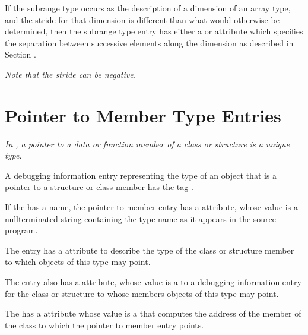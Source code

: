 If the subrange type occurs as the description of a dimension
of an array type, and the stride for that dimension is
\hypertarget{chap:DWATbytestridesubrangestridedimensionofarraytype}{}
different than what would otherwise be determined, then
\hypertarget{chap:DWATbitstridesubrangestridedimensionofarraytype}{}
the subrange type entry has either 
a 
\DWATbytestrideDEFN{} or
\DWATbitstrideDEFN{} attribute 
which specifies the separation
between successive elements along the dimension as described in 
Section .

\textit{Note that the stride can be negative.}

\section{Pointer to Member Type Entries}
\label{chap:pointertomembertypeentries}

\textit{In , a 
pointer to a data or function member of a class or
structure is a unique type.}

A debugging information entry representing the type of an
object that is a pointer to a structure or class member has
the tag \DWTAGptrtomembertypeTARG.

If the  has a name, the 
pointer to member entry has a
\DWATname{} attribute, 
whose value is a
null\dash terminated string containing the type name as it appears
in the source program.

The  entry 
has 
a \DWATtype{} attribute to
describe the type of the class or structure member to which
objects of this type may point.

The  entry also 
\hypertarget{chap:DWATcontainingtypecontainingtypeofpointertomembertype}{}
has a \DWATcontainingtypeDEFN{} attribute, 
whose value is a  to a debugging
information entry for the class or structure to whose members
objects of this type may point.

The  
\hypertarget{chap:DWATuselocationmemberlocationforpointertomembertype}{}
has a 
\DWATuselocationDEFN{} attribute
whose value is a 
 that computes the
address of the member of the class to which the pointer to
member entry points.

